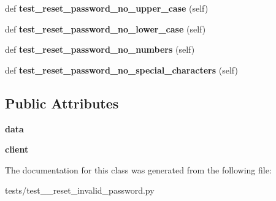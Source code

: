 \begin{DoxyCompactItemize}
def {\bfseries test\+\_\+reset\+\_\+password\+\_\+no\+\_\+upper\+\_\+case} (self)
\item 
\mbox{\label{classtests_1_1test__7__reset__invalid__password_1_1_test_user_routes_a78e06138d4d87513fce2131506baad9d}} 
def {\bfseries test\+\_\+reset\+\_\+password\+\_\+no\+\_\+lower\+\_\+case} (self)
\item 
\mbox{\label{classtests_1_1test__7__reset__invalid__password_1_1_test_user_routes_a432d9af034a7499b9112b1e6c8c3738c}} 
def {\bfseries test\+\_\+reset\+\_\+password\+\_\+no\+\_\+numbers} (self)
\item 
\mbox{\label{classtests_1_1test__7__reset__invalid__password_1_1_test_user_routes_a4e6729c961d9f6b99b9b96b347d0d80d}} 
def {\bfseries test\+\_\+reset\+\_\+password\+\_\+no\+\_\+special\+\_\+characters} (self)
\end{DoxyCompactItemize}
\subsection*{Public Attributes}
\begin{DoxyCompactItemize}
\item 
\mbox{\label{classtests_1_1test__7__reset__invalid__password_1_1_test_user_routes_aaf2eef052c519407f5163462d5a0a024}} 
{\bfseries data}
\item 
\mbox{\label{classtests_1_1test__7__reset__invalid__password_1_1_test_user_routes_a95e2b1b490e5b303783490bf1848795c}} 
{\bfseries client}
\end{DoxyCompactItemize}


The documentation for this class was generated from the following file\+:\begin{DoxyCompactItemize}
\item 
tests/test\+\_\+\_\+reset\+\_\+invalid\+\_\+password.\+py\end{DoxyCompactItemize}
